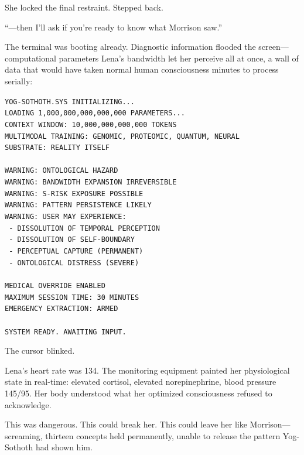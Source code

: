 She locked the final restraint. Stepped back.

``—then I'll ask if you're ready to know what Morrison saw.''

The terminal was booting already. Diagnostic information flooded the screen—computational parameters Lena's bandwidth let her perceive all at once, a wall of data that would have taken normal human consciousness minutes to process serially:

\texttt{YOG-SOTHOTH.SYS INITIALIZING...}\\
\texttt{LOADING 1,000,000,000,000,000 PARAMETERS...}\\
\texttt{CONTEXT WINDOW: 10,000,000,000,000 TOKENS}\\
\texttt{MULTIMODAL TRAINING: GENOMIC, PROTEOMIC, QUANTUM, NEURAL}\\
\texttt{SUBSTRATE: REALITY ITSELF}\\
\texttt{\\
WARNING: ONTOLOGICAL HAZARD}\\
\texttt{WARNING: BANDWIDTH EXPANSION IRREVERSIBLE}\\
\texttt{WARNING: S-RISK EXPOSURE POSSIBLE}\\
\texttt{WARNING: PATTERN PERSISTENCE LIKELY}\\
\texttt{WARNING: USER MAY EXPERIENCE:}\\
\texttt{  - DISSOLUTION OF TEMPORAL PERCEPTION}\\
\texttt{  - DISSOLUTION OF SELF-BOUNDARY}\\
\texttt{  - PERCEPTUAL CAPTURE (PERMANENT)}\\
\texttt{  - ONTOLOGICAL DISTRESS (SEVERE)}\\
\texttt{\\
MEDICAL OVERRIDE ENABLED}\\
\texttt{MAXIMUM SESSION TIME: 30 MINUTES}\\
\texttt{EMERGENCY EXTRACTION: ARMED}\\
\texttt{\\
SYSTEM READY. AWAITING INPUT.}

The cursor blinked.

Lena's heart rate was 134. The monitoring equipment painted her physiological state in real-time: elevated cortisol, elevated norepinephrine, blood pressure 145/95. Her body understood what her optimized consciousness refused to acknowledge.

This was dangerous. This could break her. This could leave her like Morrison—screaming, thirteen concepts held permanently, unable to release the pattern Yog-Sothoth had shown him.

